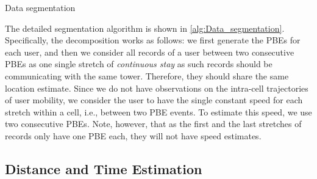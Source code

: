 \begin{algorithm}
 \caption{Data segmentation}\label{alg:Data_segmentation}
\end{algorithm}

The detailed segmentation algorithm is shown in \autoref{alg:Data_segmentation}. Specifically, the decomposition works as follows: we first generate the PBEs for each user, and then we consider all records of a user between two consecutive PBEs as one single stretch of \emph{continuous stay} as such records should be communicating with the same tower. Therefore, they should share the same location estimate. Since we do not have observations on the intra-cell trajectories of user mobility, we consider the user to have the single constant speed for each stretch within a cell, i.e., between two PBE events. To estimate this speed, we use two consecutive PBEs. 
Note, however, that as the first and the last stretches of records only have one PBE each, they will not have speed estimates.

\subsection{Distance and Time Estimation}

